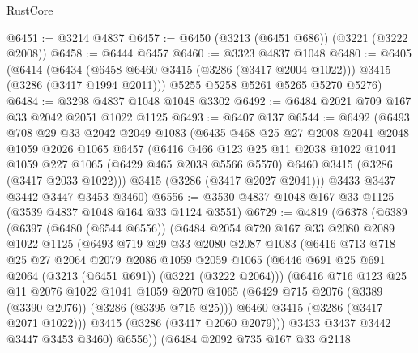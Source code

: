 \begin{lexlean}{RustCore}
\begin{coremodule}
@6451 := @3214 @4837
@6457 := @6450 (@3213 (@6451 @686)) (@3221 (@3222 @2008))
@6458 := @6444 @6457
@6460 := @3323 @4837 @1048
@6480 := @6405
    (@6414
      (@6434 (@6458 @6460 @3415 (@3286 (@3417 @2004 @1022))) @3415 (@3286 (@3417 @1994 @2011)))
      @5255
      @5258
      @5261
      @5265
      @5270
      @5276)
@6484 := @3298 @4837 @1048 @1048 @3302
@6492 := @6484 @2021 @709 @167 @33 @2042 @2051 @1022 @1125
@6493 := @6407 @137
@6544 := @6492
    (@6493
      @708
      @29
      @33
      @2042
      @2049
      @1083
      (@6435
        @468
        @25
        @27
        @2008
        @2041
        @2048
        @1059
        @2026
        @1065
        @6457
        (@6416
          @466
          @123
          @25
          @11
          @2038
          @1022
          @1041
          @1059
          @227
          @1065
          (@6429 @465 @2038 @5566 @5570)
          @6460
          @3415
          (@3286 (@3417 @2033 @1022)))
        @3415
        (@3286 (@3417 @2027 @2041)))
      @3433
      @3437
      @3442
      @3447
      @3453
      @3460)
@6556 := @3530 @4837 @1048 @167 @33 @1125 (@3539 @4837 @1048 @164 @33 @1124 @3551)
@6729 := @4819
    (@6378
      (@6389
        (@6397
          (@6480 (@6544 @6556))
          (@6484
            @2054
            @720
            @167
            @33
            @2080
            @2089
            @1022
            @1125
            (@6493
              @719
              @29
              @33
              @2080
              @2087
              @1083
              (@6416
                @713
                @718
                @25
                @27
                @2064
                @2079
                @2086
                @1059
                @2059
                @1065
                (@6446 @691 @25 @691 @2064 (@3213 (@6451 @691)) (@3221 (@3222 @2064)))
                (@6416
                  @716
                  @123
                  @25
                  @11
                  @2076
                  @1022
                  @1041
                  @1059
                  @2070
                  @1065
                  (@6429 @715 @2076 (@3389 (@3390 @2076)) (@3286 (@3395 @715 @25)))
                  @6460
                  @3415
                  (@3286 (@3417 @2071 @1022)))
                @3415
                (@3286 (@3417 @2060 @2079)))
              @3433
              @3437
              @3442
              @3447
              @3453
              @3460)
            @6556))
        (@6484
          @2092
          @735
          @167
          @33
          @2118

\end{coremodule}
\end{lexlean}
